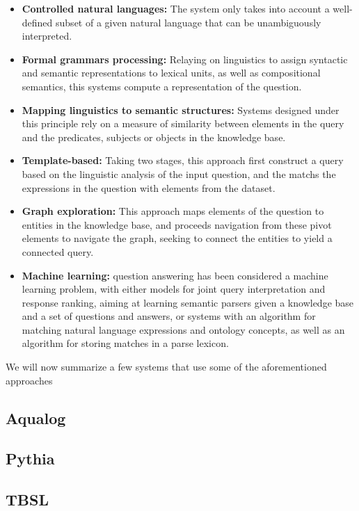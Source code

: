 \begin{itemize}
  \item \textbf{Controlled natural languages:} The system only takes into account a well-defined subset of a given natural language that can be unambiguously interpreted.
  \item \textbf{Formal grammars processing:} Relaying on linguistics to assign syntactic and semantic representations to lexical units, as well as compositional semantics, this systems compute a representation of the question.
  \item \textbf{Mapping linguistics to semantic structures:} Systems designed under this principle rely on a measure of similarity between elements in the query and the predicates, subjects or objects in the knowledge base.
  \item \textbf{Template-based:} Taking two stages, this approach first construct a query based on the linguistic analysis of the input question, and the matchs the expressions in the question with elements from the dataset.
  \item \textbf{Graph exploration:} This approach maps elements of the question to entities in the knowledge base, and proceeds navigation from these pivot elements to navigate the graph, seeking to connect the entities to yield a connected query.
  \item \textbf{Machine learning:} question answering has been considered a machine learning problem, with either models for joint query interpretation and response ranking, aiming at learning semantic parsers given a knowledge base and a set of questions and answers, or systems with an algorithm for matching natural language expressions and ontology concepts, as well as an algorithm for storing matches in a parse lexicon.
\end{itemize}

We will now summarize a few systems that use some of the aforementioned approaches

\subsection{Aqualog}

\subsection{Pythia}

\subsection{TBSL}

